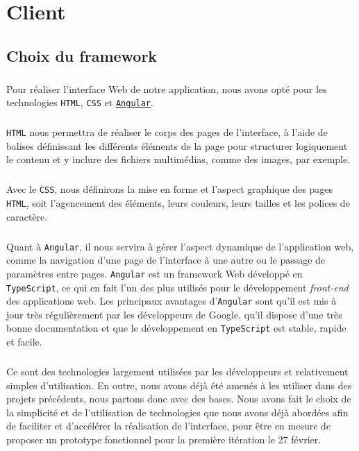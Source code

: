 \chapter{Client}

\section{Choix du framework}

\paragraph{}
Pour réaliser l’interface Web de notre application, nous avons opté pour les technologies \texttt{HTML}, \texttt{CSS} et \href{https://angular.io/}{\texttt{Angular}}.

\paragraph{}
\texttt{HTML} nous permettra de réaliser le corps des pages de l’interface, à l’aide de balises définissant les différents éléments de la page pour structurer logiquement le contenu et y inclure des fichiers multimédias, comme des images, par exemple.

\paragraph{}
Avec le \texttt{CSS}, nous définirons la mise en forme et l’aspect graphique des pages \texttt{HTML}, soit l’agencement des éléments, leurs couleurs, leurs tailles et les polices de caractère.

\paragraph{}
Quant à \texttt{Angular}, il nous servira à gérer l’aspect dynamique de l’application web, comme la navigation d’une page de l’interface à une autre ou le passage de paramètres entre pages. \texttt{Angular} est un framework Web développé en \texttt{TypeScript}, ce qui en fait l’un des plus utilisés pour le développement \textit{front-end} des applications web. Les principaux avantages d’\texttt{Angular} sont qu’il est mis à jour très régulièrement par les développeurs de Google, qu’il dispose d’une très bonne documentation et que le développement en \texttt{TypeScript} est stable, rapide et facile.

\paragraph{}
Ce sont des technologies largement utilisées par les développeurs et relativement simples d’utilisation. En outre, nous avons déjà été amenés à les utiliser dans des projets précédents, nous partons donc avec des bases. Nous avons fait le choix de la simplicité et de l’utilisation de technologies que nous avons déjà abordées afin de faciliter et d’accélérer la réalisation de l’interface, pour être en mesure de proposer un prototype fonctionnel pour la première itération le 27 février.

